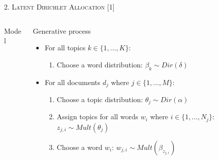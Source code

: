 \documentclass[fleqn,final]{beamer}
\begin{document}
\begin{frame}
\begin{columns}[t]
\begin{column}{.50\linewidth}
\begin{block}{\rule[-2.5mm]{0cm}{1cm}\textsc{2. Latent Dirichlet Allocation [1]}}
\begin{columns}[t]
\begin{column}{.47\linewidth}
{\begin{block}{\small{Model}}
\end{block}
}
\end{column}			

\begin{column}{.47\linewidth}
{\small 			
\vspace{-1.3cm}	
\begin{block}{\small{Generative process}}
\begin{itemize}
    \item For all topics $k \in \{1, ..., K\}$:
        \begin{enumerate}
            \item Choose a word distribution: $\beta_k \sim Dir(\delta)$
        \end{enumerate}
    \item For all documents $d_j$ where $j \in \{1, ..., M\}$:
        \begin{enumerate}
            \item Choose a topic distribution: $\theta_j \sim Dir(\alpha)$
            \item Assign topics for all words $w_i$ where $i \in \{1, ..., N_j\}$: $z_{j, i} \sim Mult(\theta_j)$
            \item Choose a word $w_i$: $w_{j, i} \sim Mult(\beta_{z_{j, i}})$
        \end{enumerate}
\end{itemize}

\end{block}
}
\end{column}
\end{columns}
\vspace{1cm}	
 	



        


\end{block}
\end{column}
\end{columns}
\end{frame}
\end{document}
